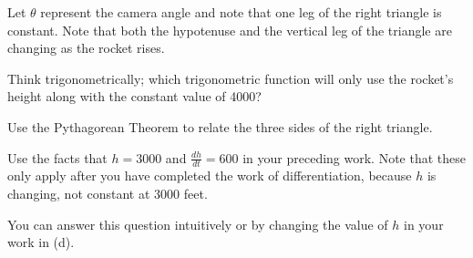 \begin{bighint}
\ba
	\item Let $\theta$ represent the camera angle and note that one leg of the right triangle is constant.  Note that both the hypotenuse and the vertical leg of the triangle are changing as the rocket rises.
	\item Think trigonometrically; which trigonometric function will only use the rocket's height along with the constant value of 4000?
	\item Use the Pythagorean Theorem to relate the three sides of the right triangle.
	\item Use the facts that $h = 3000$ and $\frac{dh}{dt} = 600$ in your preceding work.  Note that these only apply after you have completed the work of differentiation, because $h$ is changing, not constant at 3000 feet.
	\item You can answer this question intuitively or by changing the value of $h$ in your work in (d).
\ea
\end{bighint}
